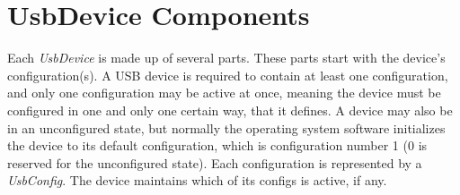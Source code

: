 \documentclass{article}
\begin{document}
%

\section{UsbDevice Components}

Each \emph{UsbDevice} is made up of several parts.  These parts start with the device's
configuration(s).  A USB device is required to contain at least one configuration, and
only one configuration may be active at once, meaning the device must be configured
in one and only one certain way, that it defines.  A device may also be in an unconfigured
state, but normally the operating system software initializes the device to its default
configuration, which is configuration number 1 (0 is reserved for the unconfigured state).
Each configuration is represented by a \emph{UsbConfig}.  The device maintains which
of its configs is active, if any.
\end{document}
